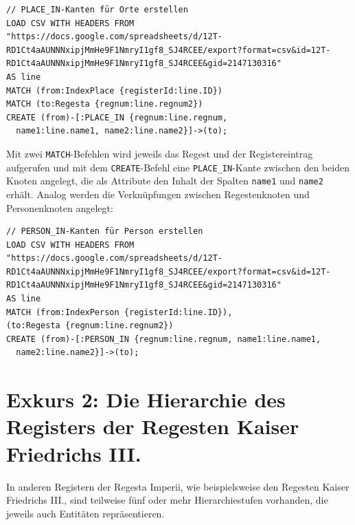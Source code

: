 \documentclass[ngerman,]{scrreprt}
\begin{document}
\begin{verbatim}
// PLACE_IN-Kanten für Orte erstellen
LOAD CSV WITH HEADERS FROM "https://docs.google.com/spreadsheets/d/12T-RD1Ct4aAUNNNxipjMmHe9F1NmryI1gf8_SJ4RCEE/export?format=csv&id=12T-RD1Ct4aAUNNNxipjMmHe9F1NmryI1gf8_SJ4RCEE&gid=2147130316"
AS line
MATCH (from:IndexPlace {registerId:line.ID})
MATCH (to:Regesta {regnum:line.regnum2})
CREATE (from)-[:PLACE_IN {regnum:line.regnum,
  name1:line.name1, name2:line.name2}]->(to);
\end{verbatim}

Mit zwei \texttt{MATCH}-Befehlen wird jeweils das Regest und der Registereintrag aufgerufen und mit dem \texttt{CREATE}-Befehl eine \texttt{PLACE\_IN}-Kante zwischen den beiden Knoten angelegt, die als Attribute den Inhalt der Spalten \texttt{name1} und \texttt{name2} erhält. Analog werden die Verknüpfungen zwischen Regestenknoten und Personenknoten angelegt:

\begin{verbatim}
// PERSON_IN-Kanten für Person erstellen
LOAD CSV WITH HEADERS FROM "https://docs.google.com/spreadsheets/d/12T-RD1Ct4aAUNNNxipjMmHe9F1NmryI1gf8_SJ4RCEE/export?format=csv&id=12T-RD1Ct4aAUNNNxipjMmHe9F1NmryI1gf8_SJ4RCEE&gid=2147130316"
AS line
MATCH (from:IndexPerson {registerId:line.ID}),
(to:Regesta {regnum:line.regnum2})
CREATE (from)-[:PERSON_IN {regnum:line.regnum, name1:line.name1,
  name2:line.name2}]->(to);
\end{verbatim}

\section{Exkurs 2: Die Hierarchie des Registers der Regesten Kaiser Friedrichs III.}\label{exkurs-2-die-hierarchie-des-registers-der-regesten-kaiser-friedrichs-iii.}

In anderen Registern der Regesta Imperii, wie beispielsweise den Regesten Kaiser Friedrichs III., sind teilweise fünf oder mehr Hierarchiestufen vorhanden, die jeweils auch Entitäten repräsentieren.
\end{document}
